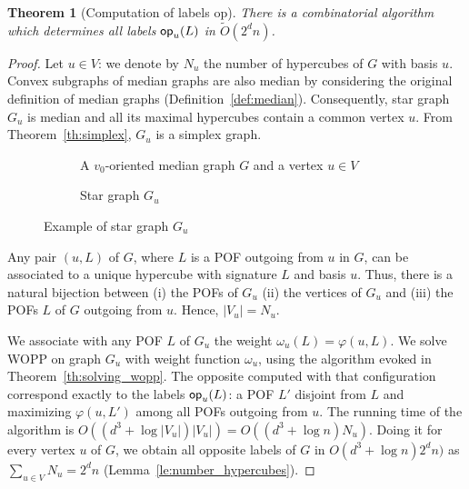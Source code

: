 \documentclass{article}
\newtheorem{theorem}{Theorem}
\newcommand{\card}[1]{\left| #1 \right|}
\newcommand{\opp}{\mbox{\textsf{op}}}
\begin{document}
\begin{theorem}[Computation of labels \opp]
There is a combinatorial algorithm which determines all labels $\opp_u(L)$ in $\tilde{O}(2^dn)$. 
\label{th:compute_opp}
\end{theorem}
\begin{proof}
Let $u \in V$: we denote by $N_u$ the number of hypercubes of $G$ with basis $u$. Convex subgraphs of median graphs are also median by considering the original definition of median graphs (Definition~\ref{def:median}). Consequently, star graph $G_u$ is median and all its maximal hypercubes contain a common vertex $u$. From Theorem~\ref{th:simplex}, $G_u$ is a simplex graph.

\begin{figure}[h]
\centering
\begin{subfigure}[b]{0.54\columnwidth}
\centering
\scalebox{0.8}{}
\caption{A $v_0$-oriented median graph $G$ and a vertex $u \in V$}
\label{subfig:compute_opposites_1}
\end{subfigure}
\begin{subfigure}[b]{0.44\columnwidth}
\centering
\scalebox{0.8}{}
\caption{Star graph $G_u$}
\label{subfig:compute_opposites_2}
\end{subfigure}

\caption{Example of star graph $G_u$}
\label{fig:compute_opposites}
\end{figure}

Any pair $(u,L)$ of $G$, where $L$ is a POF outgoing from $u$ in $G$, can be associated to a unique hypercube with signature $L$ and basis $u$. Thus, there is a natural bijection between (i) the POFs of $G_u$ (ii) the vertices of $G_u$ and (iii) the POFs $L$ of $G$ outgoing from $u$. Hence, $\card{V_u} = N_u$.

We associate with any POF $L$ of $G_u$ the weight $\omega_u(L) = \varphi(u,L)$. We solve WOPP on graph $G_u$ with weight function $\omega_u$, using the algorithm evoked in Theorem~\ref{th:solving_wopp}. The opposite computed with that configuration correspond exactly to the labels $\opp_u(L)$: a POF $L'$ disjoint from $L$ and maximizing $\varphi(u,L')$ among all POFs outgoing from $u$. The running time of the algorithm is $O((d^3+\log \card{V_u})\card{V_u}) = O((d^3+\log n)N_u)$. Doing it for every vertex $u$ of $G$, we obtain all opposite labels of $G$ in $O(d^3+\log n)2^dn)$ as $\sum_{u \in V} N_u = 2^dn$ (Lemma~\ref{le:number_hypercubes}).
\end{proof}
\end{document}
